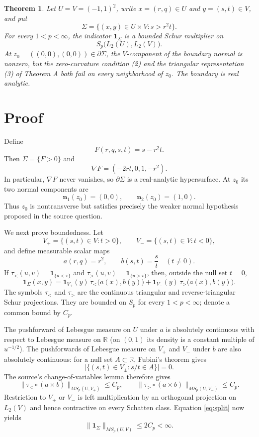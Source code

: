 \documentclass[11pt]{article}
\newcommand{\R}{\mathbb R}
\newcommand{\1}{\mathbf 1}
\newcommand{\Sp}{S_p}
\newtheorem{theorem}{Theorem}
\begin{document}
\begin{theorem}\label{thm:main}
Let $U=V=(-1,1)^2$, write $x=(r,q)\in U$ and $y=(s,t)\in V$, and put
\[
  \Sigma=\{(x,y)\in U\times V:s>r^2t\}.
\]
For every $1<p<\infty$, the indicator $\1_\Sigma$ is a bounded Schur
multiplier on
\[
  \Sp\bigl(L_2(U),L_2(V)\bigr).
\]
At $z_0=((0,0),(0,0))\in\partial\Sigma$, the $V$-component of the
boundary normal is nonzero, but the zero-curvature condition (2) and the
triangular representation (3) of Theorem A both fail on every neighborhood
of $z_0$.  The boundary is real analytic.
\end{theorem}

\section*{Proof}

Define
\[
  F(r,q,s,t)=s-r^2t.
\]
Then $\Sigma=\{F>0\}$ and
\[
  \nabla F=(-2rt,0,1,-r^2).
\]
In particular, $\nabla F$ never vanishes, so $\partial\Sigma$ is a
real-analytic hypersurface.  At $z_0$ its two normal components are
\[
  \mathbf n_1(z_0)=(0,0),\qquad
  \mathbf n_2(z_0)=(1,0).
\]
Thus $z_0$ is nontransverse but satisfies precisely the weaker normal
hypothesis proposed in the source question.

We next prove boundedness.  Let
\[
  V_+=\{(s,t)\in V:t>0\},\qquad
  V_-=\{(s,t)\in V:t<0\},
\]
and define measurable scalar maps
\[
  a(r,q)=r^2,\qquad b(s,t)=\frac{s}{t}\quad(t\ne0).
\]
If $\tau_<(u,v)=\1_{\{u<v\}}$ and
$\tau_>(u,v)=\1_{\{u>v\}}$, then, outside the null set $t=0$,
\begin{equation}\label{eq:split}
  \1_\Sigma(x,y)
  =\1_{V_+}(y)\,\tau_<\bigl(a(x),b(y)\bigr)
   +\1_{V_-}(y)\,\tau_>\bigl(a(x),b(y)\bigr).
\end{equation}
The symbols $\tau_<$ and $\tau_>$ are the continuous triangular and
reverse-triangular Schur projections.  They are bounded on $\Sp$ for every
$1<p<\infty$; denote a common bound by $C_p$.

The pushforward of Lebesgue measure on $U$ under $a$ is absolutely continuous
with respect to Lebesgue measure on $\R$ (on $(0,1)$ its density is a constant
multiple of $u^{-1/2}$).  The pushforwards of Lebesgue measure on $V_+$ and
$V_-$ under $b$ are also absolutely continuous: for a null set $A\subset\R$,
Fubini's theorem gives
\[
  \bigl|\{(s,t)\in V_\pm:s/t\in A\}\bigr|=0.
\]
The source's change-of-variables lemma \cite[Lemma 1.1]{PST} therefore gives
\[
 \bigl\|\tau_<\circ(a\times b)\bigr\|_{MS_p(U,V_+)}\le C_p,
 \qquad
 \bigl\|\tau_>\circ(a\times b)\bigr\|_{MS_p(U,V_-)}\le C_p.
\]
Restriction to $V_+$ or $V_-$ is left multiplication by an orthogonal
projection on $L_2(V)$ and hence contractive on every Schatten class.
Equation \eqref{eq:split} now yields
\[
  \|\1_\Sigma\|_{MS_p(U,V)}\le 2C_p<\infty.
\]
\end{document}
